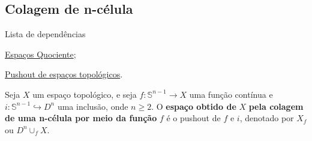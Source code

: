 \subsection{Colagem de n-célula} %
\label{colagem-de-n-celula-def}
\begin{titlemize}{Lista de dependências}
	\item \hyperref[topologia-quociente-def]{Espaços Quociente};\\
    \item \hyperref[pushout-de-espacos-topologicos-def]{Pushout de espaços topológicos}.%
\end{titlemize}

\begin{defi}
    Seja $X$ um espaço topológico, e seja $f:\mathbb{S}^{n-1}\rightarrow X$ uma função contínua e $i:\mathbb{S}^{n-1}\hookrightarrow D^n$ uma inclusão, onde $n\ge 2$. O \textbf{espaço obtido de} $X$ \textbf{pela colagem de uma n-célula por meio da função } $f$ é o pushout de $f$ e $i$, denotado por $X_f$ ou $D^n\cup_f X$.
\end{defi}

